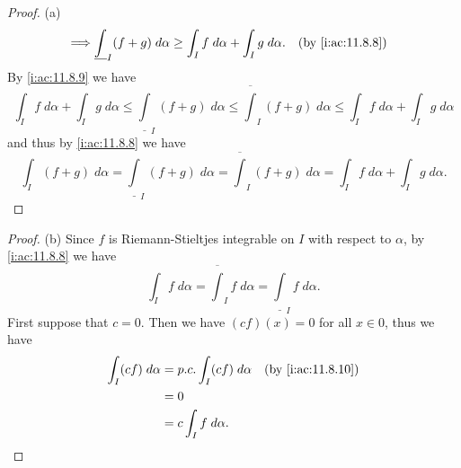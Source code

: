 \begin{proof}{(a)}
\begin{align*}
    \implies & \underline{\int}_I (f + g) \; d \alpha \geq \int_I f \; d \alpha + \int_I g \; d \alpha.                        &   & \by{i:ac:11.8.8}
  \end{align*}
  By \cref{i:ac:11.8.9} we have
  \[
    \int_I f \; d \alpha + \int_I g \; d \alpha \leq \underline{\int}_I (f + g) \; d \alpha \leq \overline{\int}_I (f + g) \; d \alpha \leq \int_I f \; d \alpha + \int_I g \; d \alpha
  \]
  and thus by \cref{i:ac:11.8.8} we have
  \[
    \int_I (f + g) \; d \alpha = \underline{\int}_I (f + g) \; d \alpha = \overline{\int}_I (f + g) \; d \alpha = \int_I f \; d \alpha + \int_I g \; d \alpha.
  \]
\end{proof}

\begin{proof}{(b)}
  Since \(f\) is Riemann-Stieltjes integrable on \(I\) with respect to \(\alpha\), by \cref{i:ac:11.8.8} we have
  \[
    \int_I f \; d \alpha = \overline{\int}_I f \; d \alpha = \underline{\int}_I f \; d \alpha.
  \]
  First suppose that \(c = 0\).
  Then we have \((cf)(x) = 0\) for all \(x \in 0\), thus we have
  \begin{align*}
    \int_I (cf) \; d \alpha & = p.c. \int_I (cf) \; d \alpha &  & \by{i:ac:11.8.10} \\
                            & = 0                                                   \\
                            & = c \int_I f \; d \alpha.
  \end{align*}


\end{proof}
